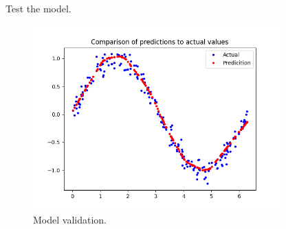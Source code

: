 \begin{frame}
    \begin{listing}[H]
        \caption{Test the model.}
        \label{lst:tflite:sinewave:test}
    \end{listing}
\end{frame}

\begin{frame}
    \begin{figure}
        \includegraphics[width=0.85\textwidth]{images/tflite/colab/test.png}
        \caption{Model validation.}
    \end{figure}
\end{frame}